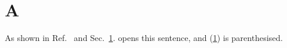 \documentclass{article}
\begin{document}
\section{A}\label{sec:a}
As shown in Ref.~\cite{a} and Sec.~\ref{sec:a}.
\cite{b} opens this sentence, and (\ref{sec:a}) is parenthesised.
\end{document}
